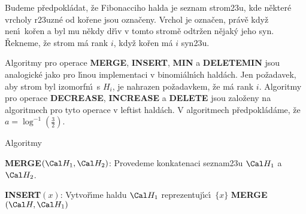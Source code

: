 \flushpar Budeme p\v redpokl\'adat, \v ze Fibonacciho halda je 
seznam strom\accent23u, kde n\v ekter\'e vrcholy 
r\accent23uzn\'e od ko\v rene jsou ozna\v ceny.  Vrchol je 
ozna\v cen, pr\'av\v e kdy\v z nen\'\i\ ko\v ren a byl mu n\v ekdy d\v r\'\i v v tomto 
strom\v e odtr\v zen n\v ejak\'y jeho syn.  \v Rekneme, \v ze strom m\'a rank $
i$, 
kdy\v z ko\v ren m\'a $i$ syn\accent23u.  
\medskip

\flushpar Algoritmy pro operace {\bf MERGE}, {\bf INSERT}, {\bf MIN} a 
{\bf DELE\-TEMIN} jsou analogick\'e jako pro l\'\i nou implementaci 
v binomi\'aln\'\i ch hald\'ach. Jen po\v zadavek, aby strom byl 
izomorfn\'\i\ s $H_i$, je nahrazen po\v zadavkem, \v ze m\'a rank $
i$. 
Algoritmy pro ope\-race {\bf DECREASE}, {\bf INCREASE} a {\bf DELETE }
jsou zalo\v zeny na algoritmech pro tyto operace v leftist 
hald\'ach. V algoritmech p\v redpokl\'ad\'ame, \v ze $a=\log^{-1}
(\frac 32)$.
\medskip

\subhead
Algoritmy
\endsubhead
\smallskip

{\bf MERGE$(\Cal H_1,\Cal H_2)$}:\newline 
Provedeme konkatenaci seznam\accent23u $\Cal H_1$ a $\Cal H_2$.
\bigskip

{\bf INSERT$(x)$}:\newline 
Vytvo\v r\'\i me haldu $\Cal H_1$ reprezentuj\'\i c\'\i\ $\{x\}$\newline 
{\bf MERGE}$(\Cal H,\Cal H_1)$
\bigskip

